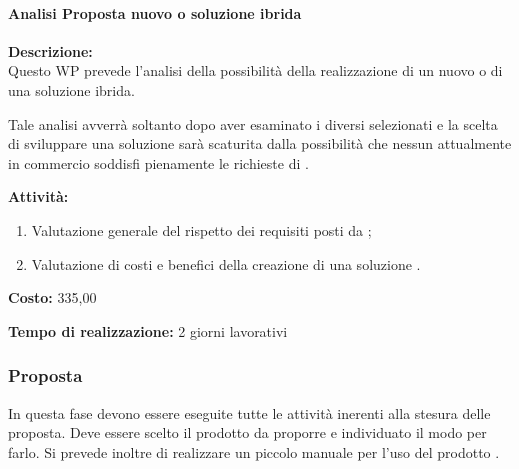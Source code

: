 \paragraph{Analisi Proposta nuovo \sw o soluzione ibrida }
\begin{description}
\item{\bfseries Descrizione:}\\
Questo WP prevede l'analisi della possibilità della realizzazione di un nuovo \sw o di una soluzione ibrida.

Tale analisi avverrà soltanto dopo aver esaminato i diversi \sw selezionati e la scelta di sviluppare una soluzione  sarà scaturita dalla possibilità che nessun \sw attualmente in commercio soddisfi pienamente le richieste di \customer.

\item  {\bfseries Attività:}
	\begin{enumerate}
    \item Valutazione generale del rispetto dei requisiti posti da \customer;
	  \item Valutazione di costi e benefici della creazione di una soluzione  .
	\end{enumerate}
\item  {\bfseries Costo:} \text{\euro} 335,00 
\item  {\bfseries Tempo di realizzazione:} 2 giorni lavorativi
\end{description}

\subsubsection{Proposta}
In questa fase devono essere eseguite tutte le attività inerenti alla stesura delle proposta. Deve essere scelto il prodotto da proporre e individuato il modo per farlo. Si prevede inoltre di realizzare un piccolo manuale per l'uso del prodotto \sw.

